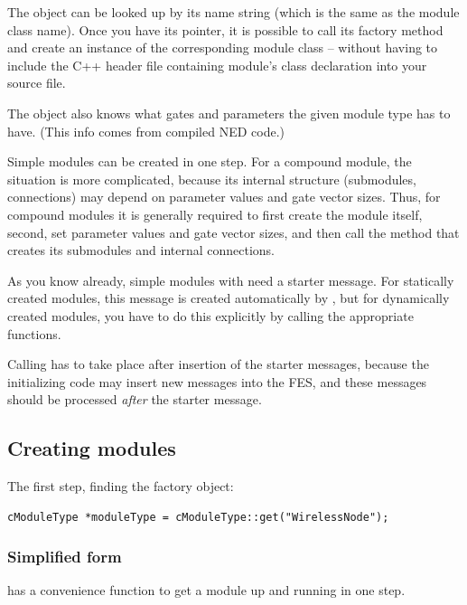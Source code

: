 The  object can be looked up by its name
string (which is the same as the module class name). Once you have its
pointer, it is possible to call its factory method and create an
instance of the corresponding module class -- without having to
include the C++ header file containing module's class declaration
into your source file.

The  object also knows what gates and
parameters the given module type has to have. (This info comes from
compiled NED code.)

Simple modules can be created in one step. For a compound module, the
situation is more complicated, because its internal structure
(submodules, connections) may depend on parameter values and gate
vector sizes. Thus, for compound modules it is generally required to
first create the module itself, second, set parameter values and gate
vector sizes, and then call the method that creates its submodules and
internal connections.

As you know already, simple modules with  need a
starter message. For statically created
modules, this message is created automatically by {\opp}, but for
dynamically created modules, you have to do this explicitly by calling
the appropriate functions.

Calling  has to take place after insertion of the
starter messages, because the initializing code may insert new messages
into the FES, and these messages should be processed
\textit{after} the starter message.

%
%


\subsection{Creating modules}

The first step, finding the factory object:

\begin{verbatim}
cModuleType *moduleType = cModuleType::get("WirelessNode");
\end{verbatim}


\subsubsection{Simplified form}

 has a
convenience function to get a module up and running in one step.

